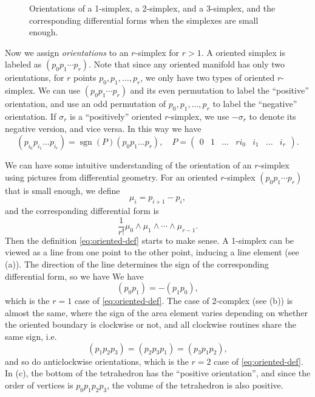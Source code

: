 \documentclass[hyperref, a4paper]{article}
\def\\{}%
\begin{document}
\begin{figure}
    \centering
    
    \caption{Orientations of a 1-simplex, a 2-simplex, and a 3-simplex, 
    and the corresponding differential forms when the simplexes are small enough.}
    \label{fig:1-2-3-simplex}
\end{figure}

Now we assign \emph{orientations} to an $r$-simplex for $r > 1$. A oriented simplex is labeled as $(p_0 p_1 \cdots p_r)$. 
Note that since any oriented manifold has only two orientations, for $r$ points $p_0, p_1, \ldots, p_r$,
we only have two types of oriented $r$-simplex. We can use $(p_0 p_1 \cdots p_r)$ and its even permutation 
to label the ``positive'' orientation, and use an odd permutation of $p_0, p_1, \ldots, p_r$ to label the ``negative''
orientation. If $\sigma_r$ is a ``positively'' oriented $r$-simplex, we use $- \sigma_r$ to denote its negative 
version, and vice versa. 
In this way we have 
\begin{equation}
    \left(p_{i_{0}} p_{i_{1}} \ldots p_{i_{r}}\right)=\operatorname{sgn}(P)\left(p_{0} p_{1} \ldots p_{r}\right), \quad 
    P=\left(\begin{array}{cccc}
        0 & 1 & \ldots & r \\
        i_{0} & i_{1} & \ldots & i_{r}
        \end{array}\right).
    \label{eq:oriented-def}
\end{equation}

We can have some intuitive understanding of the orientation of an $r$-simplex using pictures 
from differential geometry. For an oriented $r$-simplex $(p_0 p_1 \cdots p_r)$ that is small enough, we define 
\[
    \mu_i = p_{i+1} - p_i,
\]
and the corresponding differential form is 
\[
    \frac{1}{r!} \mu_0 \wedge \mu_1 \wedge \cdots \wedge \mu_{r-1}.
\]
Then the definition \eqref{eq:oriented-def} starts to make sense.
A 1-simplex can be viewed as a line from one point to the other point, inducing a line element (see (a)). 
The direction of the line determines 
the sign of the corresponding differential form, so we have 
We have 
\[
    (p_0 p_1) = - (p_1 p_0),
\]
which is the $r=1$ case of \eqref{eq:oriented-def}. The case of 2-complex (see (b)) is 
almost the same, where the sign of the area element varies depending on whether the oriented boundary is clockwise or not,
and all clockwise routines share the same sign, i.e.
\[
    (p_1 p_2 p_3) = (p_2 p_3 p_1) = (p_3 p_1 p_2),
\]
and so do anticlockwise orientations, which is the $r=2$ case of \eqref{eq:oriented-def}.
In (c), the bottom of the tetrahedron has the ``positive orientation'', and since the 
order of vertices is $p_0 p_1 p_2 p_3$, the volume of the tetrahedron is also positive.
\end{document}
